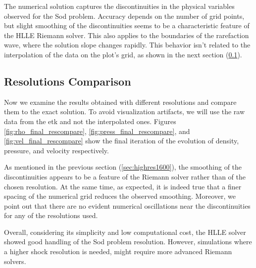 \documentclass[11pt, a4paper]{article}
\begin{document}
The numerical solution captures the discontinuities in the physical variables observed for the Sod problem. Accuracy depends on the number of grid points, but slight smoothing of the discontinuities seems to be a characteristic feature of the HLLE Riemann solver. This also applies to the boundaries of the rarefaction wave, where the solution slope changes rapidly. This behavior isn't related to the interpolation of the data on the plot's grid, as shown in the next section (\ref{sec:rescomp}).

\subsection{Resolutions Comparison} \label{sec:rescomp}

Now we examine the results obtained with different resolutions and compare them to the exact solution. To avoid visualization artifacts, we will use the raw data from the \acrshort{etk} and not the interpolated ones. Figures \ref{fig:rho_final_rescompare}, \ref{fig:press_final_rescompare}, and \ref{fig:vel_final_rescompare} show the final iteration of the evolution of density, pressure, and velocity respectively.

As mentioned in the previous section (\ref{sec:highres1600}), the smoothing of the discontinuities appears to be a feature of the Riemann solver rather than of the chosen resolution. At the same time, as expected, it is indeed true that a finer spacing of the numerical grid reduces the observed smoothing. Moreover, we point out that there are no evident numerical oscillations near the discontinuities for any of the resolutions used.

Overall, considering its simplicity and low computational cost, the HLLE solver showed good handling of the Sod problem resolution. However, simulations where a higher shock resolution is needed, might require more advanced Riemann solvers.

\newpage
\end{document}
